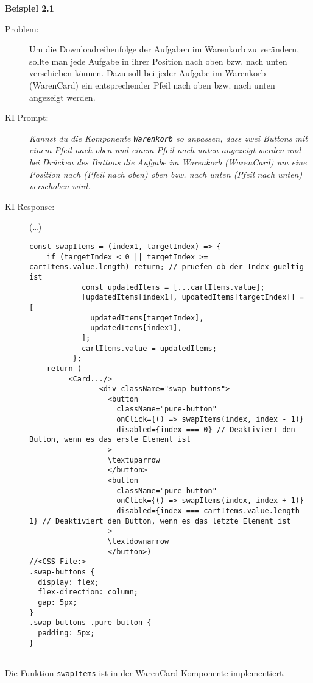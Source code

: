 \textbf{Beispiel 2.1} 
\begin{description}
    \item[Problem:] 
Um die Downloadreihenfolge der Aufgaben im Warenkorb zu verändern, sollte man jede Aufgabe in ihrer Position nach oben bzw. nach unten verschieben können. Dazu soll bei jeder Aufgabe im Warenkorb (WarenCard) ein entsprechender Pfeil nach oben bzw. nach unten angezeigt werden. 
    \item[KI Prompt:] \emph{ Kannst du die Komponente \texttt{Warenkorb} so anpassen, dass zwei Buttons mit einem Pfeil nach oben und einem Pfeil nach unten angezeigt werden und bei Drücken des Buttons die Aufgabe im Warenkorb (WarenCard) um eine Position nach (Pfeil nach oben) oben bzw. nach unten (Pfeil nach unten) verschoben wird. }
    \item[KI Response:] (\ldots)
\begin{lstlisting}
const swapItems = (index1, targetIndex) => {
    if (targetIndex < 0 || targetIndex >= cartItems.value.length) return; // pruefen ob der Index gueltig ist
            const updatedItems = [...cartItems.value];
            [updatedItems[index1], updatedItems[targetIndex]] = [
              updatedItems[targetIndex],
              updatedItems[index1],
            ];
            cartItems.value = updatedItems;
          };
    return (
         <Card.../>
                <div className="swap-buttons">
                  <button
                    className="pure-button"
                    onClick={() => swapItems(index, index - 1)}
                    disabled={index === 0} // Deaktiviert den Button, wenn es das erste Element ist
                  >
                  \textuparrow
                  </button>
                  <button
                    className="pure-button"
                    onClick={() => swapItems(index, index + 1)}
                    disabled={index === cartItems.value.length - 1} // Deaktiviert den Button, wenn es das letzte Element ist
                  >
                  \textdownarrow
                  </button>)
//<CSS-File:>
.swap-buttons {
  display: flex;
  flex-direction: column;
  gap: 5px;
}
.swap-buttons .pure-button {
  padding: 5px;
}


    \end{lstlisting}
\end{description}

Die Funktion \texttt{swapItems} ist in der WarenCard-Komponente implementiert. 


